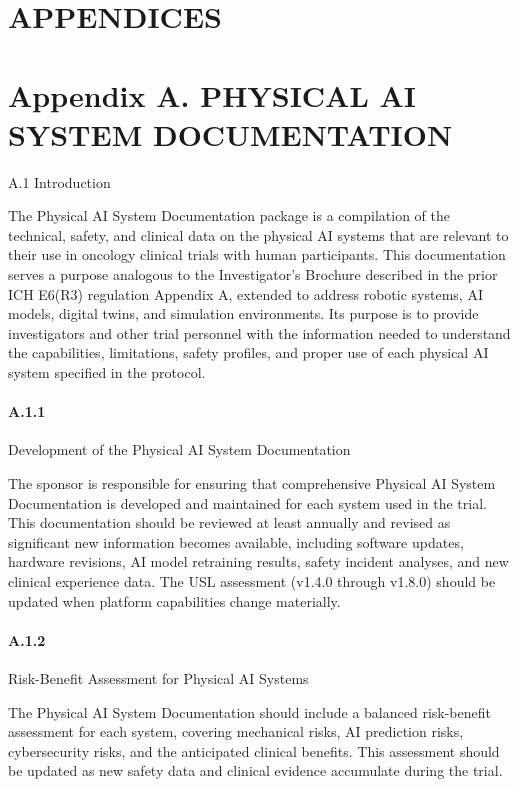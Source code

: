 \section{APPENDICES}

\section{Appendix A. PHYSICAL AI SYSTEM DOCUMENTATION}

A.1 Introduction

The Physical AI System Documentation package is a compilation of the technical, safety, and clinical data on the physical AI systems that are relevant to their use in oncology clinical trials with human participants. This documentation serves a purpose analogous to the Investigator's Brochure described in the prior ICH E6(R3) regulation Appendix A, extended to address robotic systems, AI models, digital twins, and simulation environments. Its purpose is to provide investigators and other trial personnel with the information needed to understand the capabilities, limitations, safety profiles, and proper use of each physical AI system specified in the protocol.

\paragraph{A.1.1} Development of the Physical AI System Documentation

The sponsor is responsible for ensuring that comprehensive Physical AI System Documentation is developed and maintained for each system used in the trial. This documentation should be reviewed at least annually and revised as significant new information becomes available, including software updates, hardware revisions, AI model retraining results, safety incident analyses, and new clinical experience data. The USL assessment (v1.4.0 through v1.8.0) should be updated when platform capabilities change materially.

\paragraph{A.1.2} Risk-Benefit Assessment for Physical AI Systems

The Physical AI System Documentation should include a balanced risk-benefit assessment for each system, covering mechanical risks, AI prediction risks, cybersecurity risks, and the anticipated clinical benefits. This assessment should be updated as new safety data and clinical evidence accumulate during the trial.

